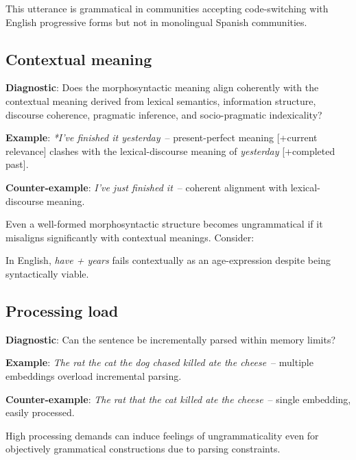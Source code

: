 \documentclass[12pt]{article}
\begin{document}
This utterance is grammatical in communities accepting code-switching with English progressive forms but not in monolingual Spanish communities.

\subsection{Contextual meaning}

\begin{tcolorbox}[colback=lsLightBlue!30]
\textbf{Diagnostic}: Does the morphosyntactic meaning align coherently with the contextual meaning derived from lexical semantics, information structure, discourse coherence, pragmatic inference, and socio-pragmatic indexicality?

\textbf{Example}: \textit{*I've finished it yesterday}~-- present-perfect meaning [+current relevance] clashes with the lexical-discourse meaning of \textit{yesterday} [+completed past].

\textbf{Counter-example}: \textit{I've just finished it}~-- coherent alignment with lexical-discourse meaning.
\end{tcolorbox}

Even a well-formed morphosyntactic structure becomes ungrammatical if it misaligns significantly with contextual meanings. Consider:

\z
In English, \textit{have + years} fails contextually as an age-expression despite being syntactically viable.

\subsection{Processing load}

\begin{tcolorbox}[colback=lsLightBlue!30]
\textbf{Diagnostic}: Can the sentence be incrementally parsed within memory limits?

\textbf{Example}: \textit{The rat the cat the dog chased killed ate the cheese}~-- multiple embeddings overload incremental parsing.

\textbf{Counter-example}: \textit{The rat that the cat killed ate the cheese}~-- single embedding, easily processed.
\end{tcolorbox}

High processing demands can induce feelings of ungrammaticality even for objectively grammatical constructions due to parsing constraints.
\end{document}
